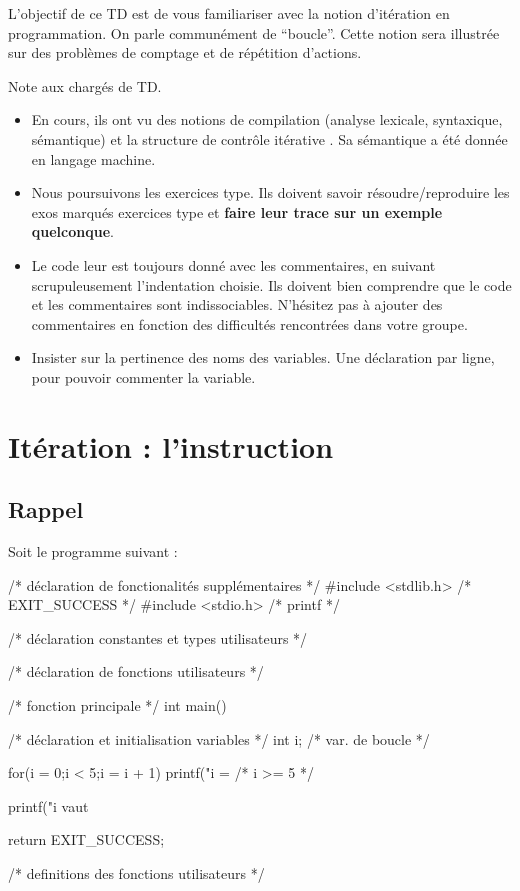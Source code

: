 
\newcommand{\commentaire}[1]{}


L'objectif de ce TD est de vous familiariser avec la notion
d'itération en programmation. On parle communément de
``boucle''. Cette notion sera illustrée sur des problèmes de comptage
et de répétition d'actions. 

\begin{correction}
  Note aux chargés de TD.
  \begin{itemize}
  \item En cours, ils ont vu des notions de compilation (analyse
    lexicale, syntaxique, sémantique) et la structure de contrôle
    itérative . Sa sémantique a été donnée en langage machine. 

  \item Nous poursuivons les exercices type. Ils doivent
    savoir résoudre/reproduire les exos marqués exercices type et
    \textbf{faire leur trace sur un exemple quelconque}.

  \item Le code leur est toujours donné avec les commentaires, en
    suivant scrupuleusement l'indentation choisie. Ils doivent bien
    comprendre que le code et les commentaires sont
    indissociables. N'hésitez pas à ajouter des commentaires en
    fonction des difficultés rencontrées dans votre groupe.

  \item Insister sur la pertinence des noms des variables. Une
    déclaration par ligne, pour pouvoir commenter la variable.
  \end{itemize}
\end{correction}

\section{Itération : l'instruction }

\subsection{Rappel}

Soit le programme suivant :
\begin{listing}{1}
/* déclaration de fonctionalités supplémentaires */
#include <stdlib.h> /* EXIT_SUCCESS */
#include <stdio.h> /* printf */

/* déclaration constantes et types utilisateurs */

/* déclaration de fonctions utilisateurs */

/* fonction principale */
int main()
{
    /* déclaration et initialisation variables */
    int i; /* var. de boucle */

    for(i = 0;i < 5;i = i + 1)
    {
        printf("i = %
    }
    /* i >= 5 */

    printf("i vaut %

    return EXIT_SUCCESS;
}

/* definitions des fonctions utilisateurs */
\end{listing}

